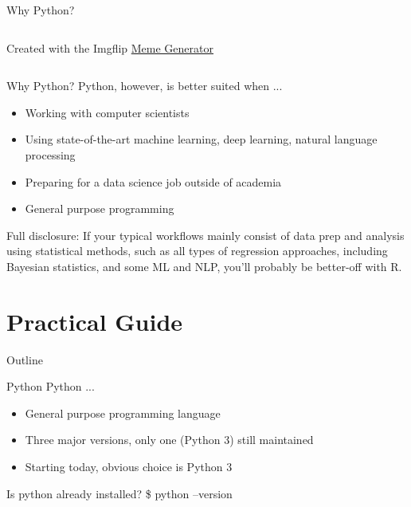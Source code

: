 \documentclass[10pt, aspectratio=169]{beamer}
\newcommand{\cemph}[1]{\textcolor{mzescyan}{#1}}
\begin{document}
{\begin{frame}{Why Python?}
\begin{columns}
\begin{column}{0.5\textwidth}
\begin{center}
            \tiny{Created with the Imgflip \href{https://imgflip.com/memegenerator}{Meme Generator}}
     \end{center}
\end{column}
\end{columns}
  \end{frame}

	\begin{frame}{Why Python?}
	\small
	\cemph{Python, however, is better suited when ...}
            \begin{itemize}
                \item Working with computer scientists
                \item Using state-of-the-art machine learning, deep learning, natural language processing
                \item Preparing for a data science job outside of academia
                \item General purpose programming
            \end{itemize}
    \small
	Full disclosure: If your typical workflows mainly consist of data prep and analysis using statistical methods, such as all types of regression approaches, including Bayesian statistics, and some ML and NLP, you'll probably be better-off with R.
  \end{frame}


\section{Practical Guide}
	\begin{frame}{Outline}
		\tableofcontents[currentsection]
	\end{frame}

	\begin{frame}{Python}
	\small
	\cemph{Python ...}
            \begin{itemize}
                \item General purpose programming language
                \item Three major versions, only one (Python 3) still maintained
                \item Starting today, obvious choice is Python 3
            \end{itemize}
   		\begin{block}{Is python already installed?}
			\$ python --version
		\end{block}       
  \end{frame}

}
\end{document}
